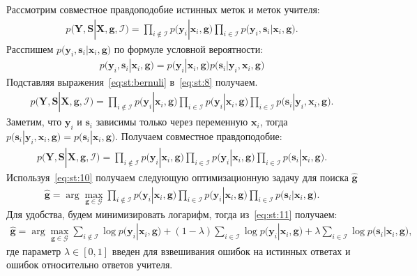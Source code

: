Рассмотрим совместное правдоподобие истинных меток и меток учителя:
\[
\label{eq:st:8}
\begin{aligned}
p\bigr(\mathbf{Y}, \mathbf{S}|\mathbf{X}, \mathbf{g}, \mathcal{I}\bigr)=\prod_{i\not\in \mathcal{I}}p\bigr(\mathbf{y}_i|\mathbf{x}_i, \mathbf{g}\bigr)\prod_{i\in \mathcal{I}}p\bigr(\mathbf{y}_i, \mathbf{s}_i|\mathbf{x}_i, \mathbf{g}\bigr).
\end{aligned}
\]
Расспишем $p\bigr(\mathbf{y}_i, \mathbf{s}_i|\mathbf{x}_i, \mathbf{g}\bigr)$ по формуле условной вероятности:
\[
\label{eq:st:bernuli}
\begin{aligned}
p\bigr(\mathbf{y}_i, \mathbf{s}_i|\mathbf{x}_i, \mathbf{g}\bigr) = p\bigr(\mathbf{y}_i|\mathbf{x}_i, \mathbf{g}\bigr)p\bigr(\mathbf{s}_i|\mathbf{y}_i, \mathbf{x}_i, \mathbf{g}\bigr)
\end{aligned}
\]
Подставляя выражения~\eqref{eq:st:bernuli} в~\eqref{eq:st:8} получаем.
\[
\label{eq:st:9}
\begin{aligned}
p\bigr(\mathbf{Y}, \mathbf{S}|\mathbf{X}, \mathbf{g}, \mathcal{I}\bigr)=\prod_{i\not\in \mathcal{I}}p\bigr(\mathbf{y}_i|\mathbf{x}_i, \mathbf{g}\bigr)\prod_{i\in \mathcal{I}}p\bigr(\mathbf{y}_i|\mathbf{x}_i, \mathbf{g}\bigr)\prod_{i\in \mathcal{I}}p\bigr(\mathbf{s}_i|\mathbf{y}_i, \mathbf{x}_i, \mathbf{g}\bigr).
\end{aligned}
\]
Заметим, что $\mathbf{y}_i$ и $\mathbf{s}_i$ зависимы только через переменную $\mathbf{x}_i$, тогда $p\bigr(\mathbf{s}_i|\mathbf{y}_i, \mathbf{x}_i, \mathbf{g}\bigr)=p\bigr(\mathbf{s}_i|\mathbf{x}_i, \mathbf{g}\bigr)$. Получаем совместное правдоподобие:
\[
\label{eq:st:10}
\begin{aligned}
p\bigr(\mathbf{Y}, \mathbf{S}|\mathbf{X}, \mathbf{g}, \mathcal{I}\bigr)=\prod_{i\not\in \mathcal{I}}p\bigr(\mathbf{y}_i|\mathbf{x}_i, \mathbf{g}\bigr)\prod_{i\in \mathcal{I}}p\bigr(\mathbf{y}_i|\mathbf{x}_i, \mathbf{g}\bigr)\prod_{i\in \mathcal{I}}p\bigr(\mathbf{s}_i|\mathbf{x}_i, \mathbf{g}\bigr).
\end{aligned}
\]
Используя~\eqref{eq:st:10} получаем следующую оптимизационную задачу для поиска $\hat{\mathbf{g}}$
\[
\label{eq:st:11}
\begin{aligned}
\hat{\mathbf{g}} = \arg\max_{\mathbf{g}\in \mathcal{G}} \prod_{i\not\in \mathcal{I}}p\bigr(\mathbf{y}_i|\mathbf{x}_i, \mathbf{g}\bigr)\prod_{i\in \mathcal{I}}p\bigr(\mathbf{y}_i|\mathbf{x}_i, \mathbf{g}\bigr)\prod_{i\in \mathcal{I}}p\bigr(\mathbf{s}_i|\mathbf{x}_i, \mathbf{g}\bigr).
\end{aligned}
\]
Для удобства, будем минимизировать логарифм, тогда из~\eqref{eq:st:11} получаем:
\[
\label{eq:st:12}
\begin{aligned}
\hat{\mathbf{g}} = \arg\max_{\mathbf{g}\in \mathcal{G}} \sum_{i\not\in \mathcal{I}}\log p\bigr(\mathbf{y}_i|\mathbf{x}_i, \mathbf{g}\bigr) + \left(1-\lambda\right)\sum_{i\in \mathcal{I}}\log p\bigr(\mathbf{y}_i|\mathbf{x}_i, \mathbf{g}\bigr) + \lambda\sum_{i\in \mathcal{I}}\log p\bigr(\mathbf{s}_i|\mathbf{x}_i, \mathbf{g}\bigr),
\end{aligned}
\]
где параметр $\lambda \in [0,1]$ введен для взвешивания ошибок на истинных ответах и ошибок относительно ответов учителя.

